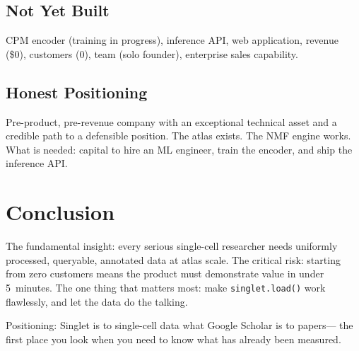 \documentclass[10pt,twocolumn,letterpaper]{article}
\begin{document}
\subsection{Not Yet Built}

CPM encoder (training in progress), inference API, web application, revenue
(\$0), customers (0), team (solo founder), enterprise sales capability.

\subsection{Honest Positioning}

Pre-product, pre-revenue company with an exceptional technical asset and a
credible path to a defensible position. The atlas exists. The NMF engine works.
What is needed: capital to hire an ML engineer, train the encoder, and ship
the inference API.

\section{Conclusion}
\label{sec:conclusion}

The fundamental insight: every serious single-cell researcher needs uniformly
processed, queryable, annotated data at atlas scale. The critical risk: starting
from zero customers means the product must demonstrate value in under 5~minutes.
The one thing that matters most: make \texttt{singlet.load()} work flawlessly,
and let the data do the talking.

Positioning: Singlet is to single-cell data what Google Scholar is to papers---
the first place you look when you need to know what has already been measured.



\end{document}
